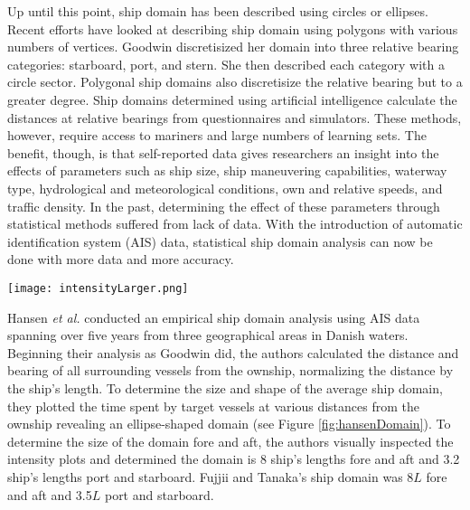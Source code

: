 \documentclass[twoside,symmetric,notoc]{tufte-book}
\newcommand{\etal}{\textit{et al.}\xspace}
\begin{document}
\par{%
Up until this point, ship domain has been described using circles or ellipses. Recent efforts have looked at describing ship domain using polygons with various numbers of vertices. Goodwin discretisized her domain into three relative bearing categories: starboard, port, and stern. She then described each category with a circle sector. Polygonal ship domains also discretisize the relative bearing but to a greater degree. Ship domains determined using artificial intelligence calculate the distances at relative bearings from questionnaires and simulators. These methods, however, require access to mariners and large numbers of learning sets.\cite{Pietrzykowski}\cite{Pietrzykowski_Uriasz} The benefit, though, is that self-reported data gives researchers an insight into the effects of parameters such as ship size, ship maneuvering capabilities, waterway type, hydrological and meteorological conditions, own and relative speeds, and traffic density. In the past, determining the effect of these parameters through statistical methods suffered from lack of data. With the introduction of automatic identification system (AIS) data, statistical ship domain analysis can now be done with more data and more
accuracy.
}
\par{%
\begin{marginfigure}
\centering
	\texttt{[image: intensityLarger.png]}
	\caption[The intensity plot suggests the ship domain is an ellipse with length 8L and width 3.2L, where L is the ship length.]{The intensity plot suggests the ship domain is an ellipse with length 8L and width 3.2L, where L is the ship length. Reprinted from Hansen \etal. pp. 934.}
	\label{fig:hansenDomain}
\end{marginfigure}
Hansen \etal\cite{Hansen} conducted an empirical ship domain analysis using AIS data spanning over five years from three geographical areas in Danish waters. Beginning their analysis as Goodwin did, the authors calculated the distance and bearing of all surrounding vessels from the ownship, normalizing the distance by the ship's length. To determine the size and shape of the average ship domain, they plotted the time spent by target vessels at various distances from the ownship revealing an ellipse-shaped domain (see Figure \ref{fig:hansenDomain}). To determine the size of the domain fore and aft, the authors visually inspected the intensity plots and determined the domain is 8 ship's lengths fore and aft and 3.2 ship's lengths port and starboard. Fujjii and Tanaka's ship domain was $8L$ fore and aft and 3.5$L$ port and starboard.
}
\end{document}
